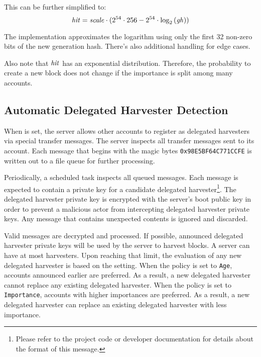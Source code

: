 This can be further simplified to:
$$
\mathit{hit} =  \mathit{scale} \cdot ( 2^{54} \cdot 256 -  2^{54} \cdot \log_2\left(\mathit{gh}\right))
$$

The implementation approximates the logarithm using only the first 32 non-zero bits of the new generation hash.
There's also additional handling for edge cases.

Also note that $\mathit{hit}$ has an exponential distribution. Therefore, the probability to create a new block does not change if the importance is split among many accounts.

\subsection{Automatic Delegated Harvester Detection}

When  is set, the server allows other accounts to register as delegated harvesters via special transfer messages.
The server inspects all transfer messages sent to its  account.
Each message that begins with the magic bytes \texttt{0x98E5BF64C771CCFE} is written out to a file queue for further processing.

Periodically, a scheduled task inspects all queued messages.
Each message is expected to contain a private key for a candidate delegated harvester\footnote{
Please refer to the project code or developer documentation for details about the format of this message.}.
The delegated harvester private key is encrypted with the server's boot public key in order to prevent a malicious actor from intercepting delegated harvester private keys.
Any message that contains unexpected contents is ignored and discarded.

Valid messages are decrypted and processed.
If possible, announced delegated harvester private keys will be used by the server to harvest blocks.
A server can have at most  harvesters.
Upon reaching that limit, the evaluation of any new delegated harvester is based on the  setting.
When the policy is set to \texttt{Age}, accounts announced earlier are preferred.
As a result, a new delegated harvester cannot replace any existing delegated harvester.
When the policy is set to \texttt{Importance}, accounts with higher importances are preferred.
As a result, a new delegated harvester can replace an existing delegated harvester with less importance.

